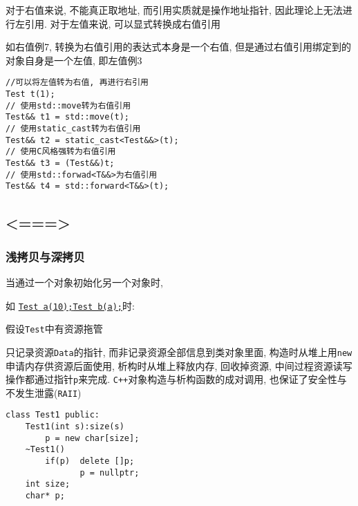 \vspace*{2em}
\begin{paracol}{2}
	\begin{leftcolumn}
		对于右值来说, 不能真正取地址, 而引用实质就是操作地址指针, 因此理论上无法进行左引用. 对于左值来说, 
			可以显式转换成右值引用

		如右值例7, 转换为右值引用的表达式本身是一个右值, 但是通过右值引用绑定到的对象自身是一个左值, 即左值例3
	\end{leftcolumn}
	\begin{rightcolumn}
		\begin{lstlisting}[basicstyle=\small,columns=flexible,xleftmargin=5em,xrightmargin=5em]
//可以将左值转为右值, 再进行右引用
Test t(1);
// 使用std::move转为右值引用
Test&& t1 = std::move(t);
// 使用static_cast转为右值引用
Test&& t2 = static_cast<Test&&>(t);
// 使用C风格强转为右值引用
Test&& t3 = (Test&&)t;
// 使用std::forwad<T&&>为右值引用
Test&& t4 = std::forward<T&&>(t);
		\end{lstlisting}
	\end{rightcolumn}
\end{paracol}
\subsection{<===>\color{purple}{移动语义与完美转发}}
\subsubsection{浅拷贝与深拷贝}
\begin{paracol}{2}
	
	\begin{leftcolumn}
	当通过一个对象初始化另一个对象时,

	如 \uline{{\tt Test a(10);}}\uline{{\tt Test b(a);}}时:

	假设{\tt Test}中有资源拖管
		
	只记录资源{\tt Data}的指针, 而非记录资源全部信息到类对象里面, 
		构造时从堆上用{\tt new}申请内存供资源后面使用, 析构时从堆上释放内存, 回收掉资源, 
		中间过程资源读写操作都通过指针{\tt p}来完成. {\tt C++}对象构造与析构函数的成对调用, 
		也保证了安全性与不发生泄露({\tt RAII})
	\end{leftcolumn}
	\begin{rightcolumn}
\begin{lstlisting}[xleftmargin=2em,xrightmargin=2em]
class Test1 public:
	Test1(int s):size(s) 
		p = new char[size];
	~Test1()
		if(p)  delete []p; 
			   p = nullptr;
	int size;
	char* p;
\end{lstlisting}	
	\end{rightcolumn}
\end{paracol}

